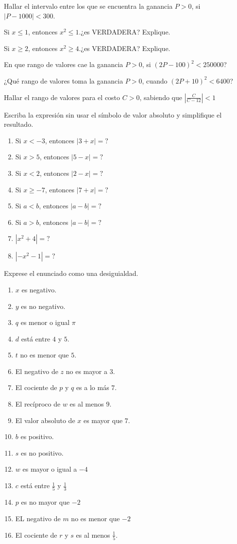 \documentclass[]{book}
\theoremstyle{definition}
\theoremstyle{definition}
\theoremstyle{definition}
\theoremstyle{remark}
\begin{document}
Hallar el intervalo entre los que se encuentra la ganancia \(P>0\), si \(\left|P-1000\right|<300\).

Si \(x\leq 1\), entonces \(x^2\leq 1\).¿es VERDADERA? Explique.

Si \(x\geq 2\), entonces \(x^2\geq 4\).¿es VERDADERA? Explique.

En que rango de valores cae la ganancia \(P>0\), si \((2P-100)^2<250000\)?

¿Qué rango de valores toma la ganancia \(P>0\), cuando \((2P+10)^2<6400\)?

Hallar el rango de valores para el costo \(C>0\), sabiendo que \(\left|\frac{C}{C-12}\right|<1\)

Escriba la expresión sin usar el símbolo de valor absoluto y simplifique el resultado.

\begin{enumerate}
	\item Si $x<-3$, entonces $\left|3+x\right|=?$
	\item Si $x>5$, entonces $\left|5-x\right|=?$
	\item Si $x<2$, entonces $\left|2-x\right|=?$
	\item Si $x\geq -7$, entonces $\left|7+x\right|=?$
	\item Si $a<b$, entonces $\left|a-b\right|=?$
	\item Si $a>b$, entonces $\left|a-b\right|=?$
	\item $\left|x^2+4\right|=?$
	\item $\left|-x^2-1\right|=?$
\end{enumerate}

Exprese el enunciado como una desiguialdad.

\begin{enumerate}
	\item $x$ es negativo.
	\item $y$ es no negativo.
	\item $q$ es menor o igual $\pi$
	\item $d$ está entre $4$ y $5$.
	\item $t$ no es menor que $5$.
	\item El negativo de $z$ no es mayor a $3$.
	\item El cociente de $p$ y $q$ es a lo más $7$.
	\item El recíproco de $w$ es al menos $9$.
	\item El valor absoluto de $x$ es mayor que $7$.
	\item $b$ es positivo.
	\item $s$ es no positivo.
	\item $w$ es mayor o igual a $-4$
	\item $c$ está entre $\frac{1}{5}$ y $\frac{1}{3}$
	\item $p$ es no mayor que $-2$
	\item EL negativo de $m$ no es menor que $-2$
	\item El cociente de $r$ y $s$ es al menos $\frac{1}{5}$.
\end{enumerate}
\end{document}
